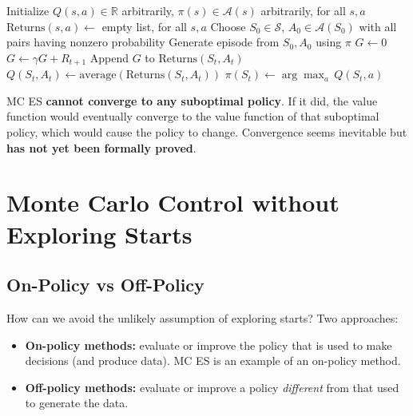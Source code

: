 \documentclass[11pt,a4paper]{article}
\theoremstyle{definition}
\theoremstyle{plain}
\theoremstyle{remark}
\begin{document}
\begin{algorithm}
\caption{Monte Carlo ES (Exploring Starts), estimating $\pi \approx \pi_*$}
\begin{algorithmic}
\STATE Initialize $Q(s, a) \in \mathbb{R}$ arbitrarily, $\pi(s) \in \mathcal{A}(s)$ arbitrarily, for all $s, a$
\STATE $\text{Returns}(s, a) \leftarrow$ empty list, for all $s, a$
\LOOP
    \STATE Choose $S_0 \in \mathcal{S}$, $A_0 \in \mathcal{A}(S_0)$ with all pairs having nonzero probability
    \STATE Generate episode from $S_0, A_0$ using $\pi$
    \STATE $G \leftarrow 0$
        \STATE $G \leftarrow \gamma G + R_{t+1}$
            \STATE Append $G$ to $\text{Returns}(S_t, A_t)$
            \STATE $Q(S_t, A_t) \leftarrow \text{average}(\text{Returns}(S_t, A_t))$
            \STATE $\pi(S_t) \leftarrow \arg\max_a\, Q(S_t, a)$
        \ENDIF
    \ENDFOR
\ENDLOOP
\end{algorithmic}
\end{algorithm}

\begin{tcolorbox}[colback=green!5!white, colframe=green!60!black, title={Convergence of MC ES}]
MC ES \textbf{cannot converge to any suboptimal policy}. If it did, the value function would eventually converge to the value function of that suboptimal policy, which would cause the policy to change. Convergence seems inevitable but \textbf{has not yet been formally proved}.
\end{tcolorbox}

\section{Monte Carlo Control without Exploring Starts}

\subsection{On-Policy vs Off-Policy}

How can we avoid the unlikely assumption of exploring starts? Two approaches:
\begin{itemize}
    \item \textbf{On-policy methods:} evaluate or improve the policy that is used to make decisions (and produce data). MC ES is an example of an on-policy method.
    \item \textbf{Off-policy methods:} evaluate or improve a policy \textit{different} from that used to generate the data.
\end{itemize}
\end{document}
